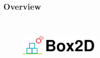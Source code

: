 \begin{frame}
	\frametitle{Overview} 
	\begin{columns}
		\tableofcontents[] 
		\begin{figure}
		\includegraphics[width=4cm ,height=2cm]{box2d.jpg}
		\end{figure}
	
	\end{columns}
\end{frame}

